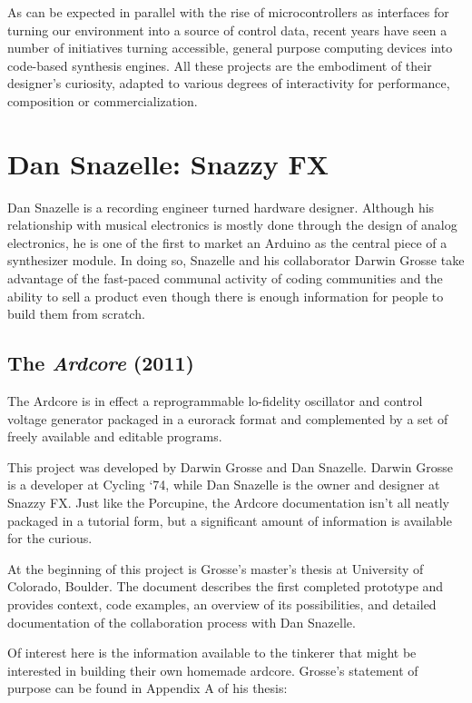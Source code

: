 As can be expected in parallel with the rise of microcontrollers as interfaces for turning our environment into a source of control data, recent years have seen a number of initiatives turning accessible, general purpose computing devices into code-based synthesis engines. All these projects are the embodiment of their designer's curiosity, adapted to various degrees of interactivity for performance, composition or commercialization. 

\section{Dan Snazelle: Snazzy FX}

Dan Snazelle is a recording engineer turned hardware designer. Although his relationship with musical electronics is mostly done through the design of analog electronics, he is one of the first to market an Arduino as the central piece of a synthesizer module. In doing so, Snazelle and his collaborator Darwin Grosse take advantage of the fast-paced communal activity of coding communities and the ability to sell a product even though there is enough information for people to build them from scratch. 

\subsection{The \textit{Ardcore} (2011)}

The Ardcore is in effect a reprogrammable lo-fidelity oscillator and control voltage generator packaged in a eurorack format and complemented by a set of freely available and editable programs. 

This project was developed by Darwin Grosse and Dan Snazelle. Darwin Grosse is a developer at Cycling `74, while Dan Snazelle is the owner and designer at Snazzy FX. Just like the Porcupine, the Ardcore documentation isn't all neatly packaged in a tutorial form, but a significant amount of  information is available for the curious. 

At the beginning of this project is Grosse's master's thesis at University of Colorado, Boulder. The document describes the first completed prototype and provides context, code examples, an overview of its possibilities, and detailed documentation of the collaboration process with Dan Snazelle. 

Of interest here is the information available to the tinkerer that might be interested in building their own homemade ardcore. Grosse's statement of purpose can be found in Appendix A of his thesis: 

